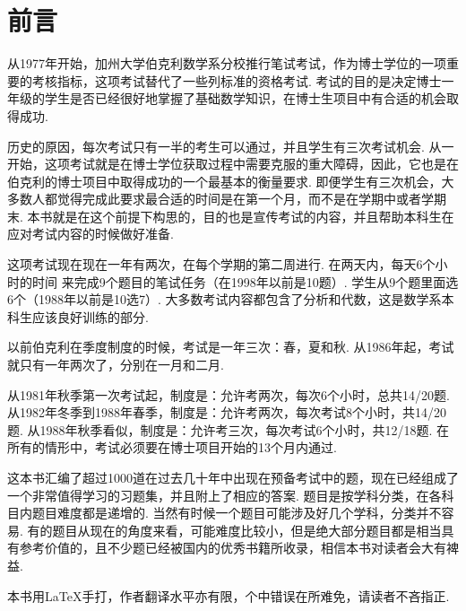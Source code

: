\chapter*{\kaishu 前言}
  从1977年开始，加州大学伯克利数学系分校推行笔试考试，作为博士学位的一项重要的考核指标，这项考试替代了一些列标准的资格考试. 考试的目的是决定博士一年级的学生是否已经很好地掌握了基础数学知识，在博士生项目中有合适的机会取得成功.

  历史的原因，每次考试只有一半的考生可以通过，并且学生有三次考试机会. 从一开始，这项考试就是在博士学位获取过程中需要克服的重大障碍，因此，它也是在伯克利的博士项目中取得成功的一个最基本的衡量要求. 即便学生有三次机会，大多数人都觉得完成此要求最合适的时间是在第一个月，而不是在学期中或者学期末. 本书就是在这个前提下构思的，目的也是宣传考试的内容，并且帮助本科生在应对考试内容的时候做好准备.

  这项考试现在现在一年有两次，在每个学期的第二周进行. 在两天内，每天6个小时的时间
  来完成9个题目的笔试任务（在1998年以前是10题）. 学生从9个题里面选6个（1988年以前是10选7）. 大多数考试内容都包含了分析和代数，这是数学系本科生应该良好训练的部分. 

  以前伯克利在季度制度的时候，考试是一年三次：春，夏和秋. 从1986年起，考试就只有一年两次了，分别在一月和二月.

  从1981年秋季第一次考试起，制度是：允许考两次，每次6个小时，总共14/20题. 从1982年冬季到1988年春季，制度是：允许考两次，每次考试8个小时，共14/20题. 从1988年秋季看似，制度是：允许考三次，每次考试6个小时，共12/18题. 在所有的情形中，考试必须要在博士项目开始的13个月内通过.
  
  这本书汇编了超过1000道在过去几十年中出现在预备考试中的题，现在已经组成了一个非常值得学习的习题集，并且附上了相应的答案. 题目是按学科分类，在各科目内题目难度都是递增的. 当然有时候一个题目可能涉及好几个学科，分类并不容易. 有的题目从现在的角度来看，可能难度比较小，但是绝大部分题目都是相当具有参考价值的，且不少题已经被国内的优秀书籍所收录，相信本书对读者会大有裨益.

  本书用\LaTeX{}手打，作者翻译水平亦有限，个中错误在所难免，请读者不吝指正. 
